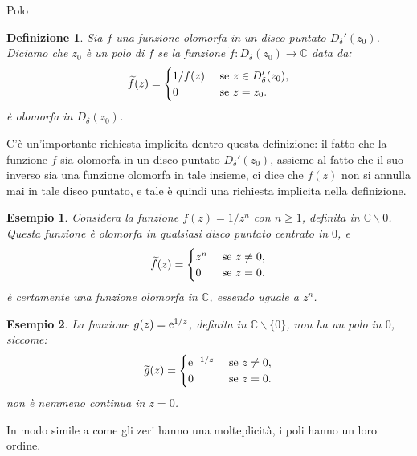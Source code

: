 \documentclass[11pt]{book}
\theoremstyle{Definizione}
\newtheorem*{mydef}{Definizione}
\theoremstyle{TeoremaProposizioneLemmaCorollarioCongettura}
\theoremstyle{OsservazioneNotaEsempio}
\newtheorem{myes}{Esempio}[section]
\newcommand{\C}{\mathbb{C}}
\newcommand{\Disc}[3][]{D^{#1}_{{#2}}({#3})}
\newcommand{\DiscPunt}[2]{D_{#1}'({#2})}
\newcommand{\tolto}{\smallsetminus}
\newcommand{\e}{\textup{e}}
\begin{document}
\begin{boxdef}{Polo}
\begin{mydef}
Sia $f$ una funzione olomorfa in un disco puntato $\DiscPunt{\delta}{z_0}$. Diciamo che $z_0$ è un polo di $f$ se la funzione $\widetilde{f}:\Disc{\delta}{z_0} \longrightarrow \C$ data da:
$$
\widetilde{f}(z) = \begin{cases}
1/f(z) &\textup{ se }z\in \DiscPunt{\delta}{z_0},\\
0 &\textup{ se }z = z_0.
\end{cases}
$$
è olomorfa in $\Disc{\delta}{z_0}$.
\end{mydef}
\end{boxdef}
\noindent
C'è un'importante richiesta implicita dentro questa definizione: il fatto che la funzione $f$ sia olomorfa in un disco puntato $\DiscPunt{\delta}{z_0}$, assieme al fatto che il suo inverso sia una funzione olomorfa in tale insieme, ci dice che $f(z)$ non si annulla mai in tale disco puntato, e tale è quindi una richiesta implicita nella definizione.
\begin{myes}
Considera la funzione $f(z) = 1/z^n$ con $n\geq 1$, definita in $\C \tolto 0$. Questa funzione è olomorfa in qualsiasi disco puntato centrato in $0$, e
$$
\widetilde{f}(z) = \begin{cases}
z^n &\textup{ se }z \neq 0,\\
0 &\textup{ se }z = 0.
\end{cases}
$$
è certamente una funzione olomorfa in $\C$, essendo uguale a $z^n$.
\end{myes}
\begin{myes}
La funzione $g(z) = \e^{1/z}$, definita in $\C \tolto \{0\}$, non ha un polo in $0$, siccome:
$$
\widetilde{g}(z) = \begin{cases}
\e^{-1/z} &\textup{ se }z \neq 0,\\
0 &\textup{ se }z = 0.
\end{cases}
$$
non è nemmeno continua in $z = 0$.
\end{myes}
In modo simile a come gli zeri hanno una molteplicità, i poli hanno un loro ordine.
\end{document}
